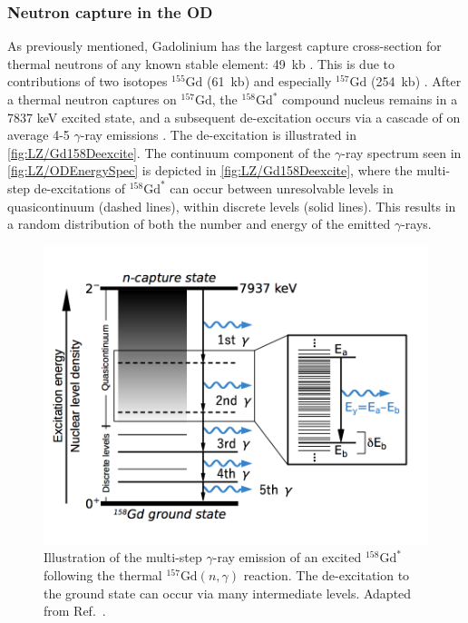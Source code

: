 \subsubsection{Neutron capture in the OD}\label{sec:LZ/NeutronCapture}
As previously mentioned, Gadolinium has the largest capture cross-section for thermal neutrons of any known stable element: 49~kb \cite{Hagiwara:2018kmr}. This is due to contributions of two isotopes $^{155}\text{Gd}$ (61~kb) and especially $^{157}\text{Gd}$ (254~kb) \cite{Hagiwara:2018kmr}. After a thermal neutron captures on $^{157}\text{Gd}$, the $^{158}\text{Gd}^*$ compound nucleus remains in a 7837 keV excited state, and a subsequent de-excitation occurs via a cascade of on average 4-5 $\gamma$-ray emissions \cite{Hagiwara:2018kmr}. The de-excitation is illustrated in \autoref{fig:LZ/Gd158Deexcite}. The continuum component of the $\gamma$-ray spectrum seen in \autoref{fig:LZ/ODEnergySpec} is depicted in \autoref{fig:LZ/Gd158Deexcite}, where the multi-step de-excitations of $^{158}\text{Gd}^*$ can occur between unresolvable levels in quasicontinuum (dashed lines), within discrete levels (solid lines). This results in a random distribution of both the number and energy of the emitted $\gamma$-rays. 

\begin{figure}[!h]
    \centering
    \includegraphics[width=0.67\linewidth]{figures/LZ/ContinuumEmission2.png}
    \caption[Illustration of the multi-step $\gamma$-ray emission of an excited $^{158}\text{Gd}^*$ following the thermal $^{157}\text{Gd}(n,\gamma)$ reaction.]{Illustration of the multi-step $\gamma$-ray emission of an excited $^{158}\text{Gd}^*$ following the thermal $^{157}\text{Gd}(n,\gamma)$ reaction. The de-excitation to the ground state can occur via many intermediate levels. Adapted from Ref.~\cite{Hagiwara:2018kmr}.}
    \label{fig:LZ/Gd158Deexcite}
\end{figure}


